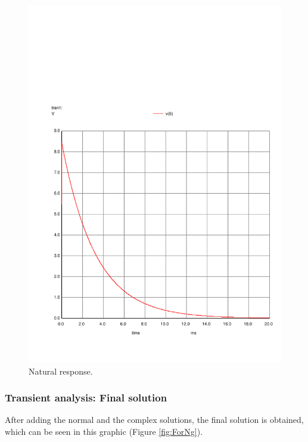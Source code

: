 \begin{figure}[H] \centering
    \includegraphics[width=0.9\linewidth]{../Simulation/trans_nat.pdf}
    \caption{Natural response.}
    \label{fig:NatNg}
\end{figure}



\subsubsection{Transient analysis: Final solution}

\indent

After adding the normal and the complex solutions, the final solution is obtained, which can be seen in this graphic (Figure \ref{fig:ForNg}).

